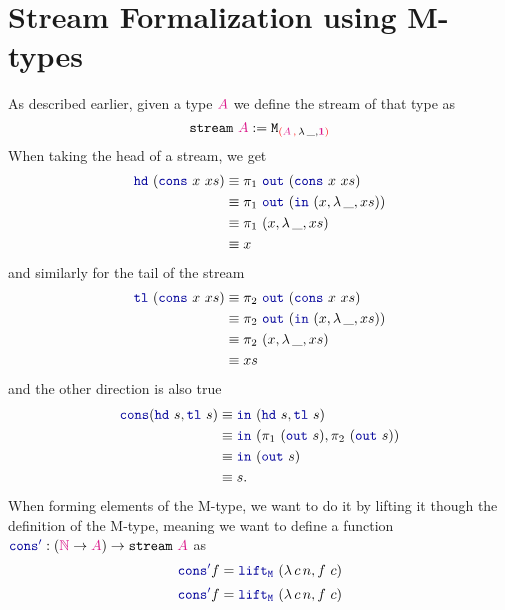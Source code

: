 \documentclass[twoside,11pt,openright]{report}
\newcommand*{\type}[1]{\textcolor{magenta!90!black}{#1}}
\newcommand*{\containerpair}[2]{\textcolor{red}{(}#1\,\textcolor{red}{,}\,#2\textcolor{red}{)}}
\newcommand*{\unit}{\type{\textbf{1}}}
\newcommand*{\function}[1]{\textcolor{blue!60!black}{\ensuremath{\mathtt{#1}}}}
\newcommand*{\typeformer}[1]{\ensuremath{\mathtt{#1}}}
\begin{document}
\section{Stream Formalization using M-types}
As described earlier, given a type \(\type{A}\) we define the stream of that type as
\begin{equation}
  \typeformer{stream}~\type{A} := \typeformer{M}_{\containerpair{\type{A}}{\lambda\,\_,\unit}}
\end{equation}
When taking the head of a stream, we get
\begin{align}
  \function{hd}~(\function{cons}~x~xs) &\equiv \pi_1~\function{out}~(\function{cons}~x~xs) \\
                                       &\equiv \pi_1~\function{out}~(\function{in}~(x , \lambda\,\_,xs)) \\
                                       &\equiv \pi_1~(x , \lambda\,\_,xs) \\
                                       &\equiv x
\end{align}
and similarly for the tail of the stream
\begin{align}
  \function{tl}~(\function{cons}~x~xs) &\equiv \pi_2~\function{out}~(\function{cons}~x~xs) \\
                                       &\equiv \pi_2~\function{out}~(\function{in}~(x , \lambda\,\_,xs)) \\
                                       &\equiv \pi_2~(x , \lambda\,\_,xs) \\
                                       &\equiv xs
\end{align}
and the other direction is also true
\begin{align}
  \function{cons}(\function{hd}~s , \function{tl}~s) &\equiv \function{in}~(\function{hd}~s , \function{tl}~s) \\
                                                     &\equiv \function{in}~(\pi_1~(\function{out}~s) , \pi_2~(\function{out}~s)) \\
                                                     &\equiv \function{in}~(\function{out}~s) \\
                                                     &\equiv s.
\end{align}
When forming elements of the M-type, we want to do it by lifting it though the definition of the M-type, meaning we want to define a function \(\function{cons'} : (\type{\mathbb{N}} \rightarrow \type{A}) \rightarrow \typeformer{stream}~\type{A}\) as
\begin{equation}
  \function{cons'} f = \function{lift_M}~(\lambda\,c\,n, f~c)
\end{equation}
\begin{equation}
  \function{cons'} f = \function{lift_M}~(\lambda\,c\,n, f~c)
\end{equation}
\end{document}
